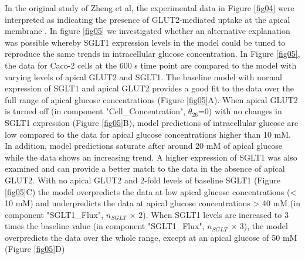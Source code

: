 \documentclass[fleqn,10pt]{physiome}
\begin{document}
In the original study of Zheng et al, the experimental data in Figure \ref{fig04}
were interpreted as indicating the presence of GLUT2-mediated uptake at the
apical membrane \citep{zheng2012mechanisms}. In figure \ref{fig05} we investigated whether an alternative explanation
was possible whereby SGLT1 expression levels in the model could be
tuned to reproduce the same trends in intracellular glucose concentration. In
Figure \ref{fig05}, the data for Caco-2 cells at the 600 s time point are compared
to the model with varying levels of apical GLUT2 and SGLT1. The baseline
model with normal expression of SGLT1 and apical GLUT2 provides a good fit
to the data over the full range of apical glucose concentrations (Figure \ref{fig05}A). 
When apical GLUT2 is turned off (in component "Cell\_Concentration", {$\theta_{26}$}=0) with no changes in SGLT1 expression (Figure
\ref{fig05}B), model predictions of intracellular glucose are low compared to the
data for apical glucose concentrations higher than 10 mM. In addition, model
predictions saturate after around 20 mM of apical glucose while the data shows
an increasing trend. A higher expression of SGLT1 was also examined and can
provide a better match to the data in the absence of apical GLUT2. With
no apical GLUT2 and 2-fold levels of baseline SGLT1 (Figure \ref{fig05}C) the model
overpredicts the data at low apical glucose concentrations (< 10 mM) and underpredicts
the data at apical glucose concentrations > 40 mM (in component "SGLT1\_Flux", $n_{SGLT}$ $\times$ $2$). When SGLT1 levels are increased to 3 times the baseline value (in component "SGLT1\_Flux", $n_{SGLT}$ $\times$ $3$), the model overpredicts the data over the whole range, except at an apical glucose of 50 mM (Figure \ref{fig05}D)
\end{document}
